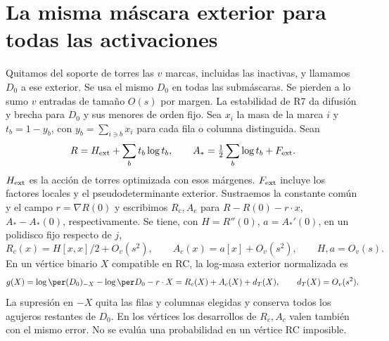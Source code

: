 \section{La misma máscara exterior para todas las activaciones}
Quitamos del soporte de torres las $v$ marcas, incluidas las inactivas, y llamamos
$D_0$ a ese exterior. Se usa el mismo $D_0$ en todas las submáscaras.
Se pierden a lo sumo $v$ entradas de tamaño $O(s)$ por margen. La estabilidad de
R7 da difusión y brecha para $D_0$ y sus menores de orden fijo.
Sea $x_i$ la masa de la marca $i$ y $t_b=1-y_b$, con
$y_b=\sum_{i\ni b}x_i$ para cada fila o columna distinguida. Sean
\[
 R=H_{\rm ext}+\sum_b t_b\log t_b,\qquad
 A_*=\tfrac12\sum_b\log t_b+F_{\rm ext}.
\]
$H_{\rm ext}$ es la acción de torres optimizada con esos márgenes. $F_{\rm ext}$
incluye los factores locales y el pseudodeterminante exterior. Sustraemos la
constante común y el campo $r=\nabla R(0)$ y escribimos $R_c,A_c$ para
$R-R(0)-r\cdot x$, $A_*-A_*(0)$, respectivamente. Se tiene, con $H=R''(0)$,
$a=A_*'(0)$, en un polidisco fijo respecto de $j$,
\[
 R_c(x)=H[x,x]/2+O_v(s^2),\qquad A_c(x)=a[x]+O_v(s^2),\qquad H,a=O_v(s).
\]
En un vértice binario $X$ compatible en RC, la log-masa exterior normalizada es
\[
 g(X)=\log\per (D_0)_{-X}-\log\per D_0-r\cdot X
     =R_c(X)+A_c(X)+d_T(X),\qquad d_T(X)=O_v(s^2).
\]
La supresión en $-X$ quita las filas y columnas elegidas y conserva todos los
agujeros restantes de $D_0$. En los vértices los desarrollos de $R_c,A_c$ valen
también con el mismo error. No se evalúa una probabilidad en un vértice RC imposible.

